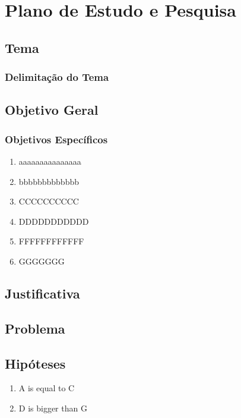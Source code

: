 \chapter{Plano de Estudo e Pesquisa} \label{chap:ResearchPlan}




\section{Tema} \label{sec::Theme}



\subsection{Delimitação do Tema} \label{subsec::ThemeDelimitation}

\lipsum[2-3]

\section{Objetivo Geral} \label{sec:objective}


\subsection{Objetivos Específicos}
\begin{enumerate}
    \item aaaaaaaaaaaaaaa
    \item bbbbbbbbbbbbb
    \item CCCCCCCCCC
    \item DDDDDDDDDDD
    \item FFFFFFFFFFFF
    \item GGGGGGG
\end{enumerate}


\section{Justificativa}\label{sec:justification}



\section{Problema} \label{sec::Problem}



\section{Hipóteses} \label{sec::Hypothesis}
\begin{enumerate}
    \item A is equal to C
    \item D is bigger than G
\end{enumerate}



